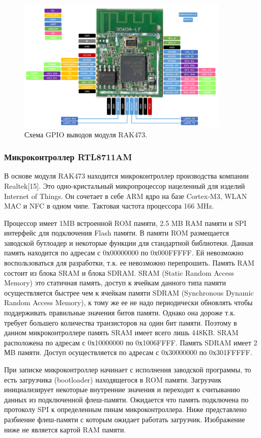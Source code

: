 \begin{figure}[h!]
    \centering
    \includegraphics[width=0.9\textwidth]{rak473_pinout.png}
    \caption{Схема GPIO выводов модуля RAK473.}
\end{figure}

\subsubsection{ Микроконтроллер RTL8711AM}
В основе модуля RAK473 находится микроконтроллер производства компании Realtek[15]. Это одно-кристальный микропроцессор нацеленный для изделий Internet of Things. Он сочетает в себе ARM ядро на базе Cortex-M3, WLAN MAC и NFC в одном чипе. Тактовая частота процессора 166 MHz. 

Процессор имеет 1MB встроенной ROM памяти, 2.5 MB RAM памяти и SPI интерфейс для подключения Flash памяти.  В памяти ROM размещается заводской бутлоадер и некоторые функции для стандартной библиотеки. Данная память находится по адресам с 0х00000000 по 0х000FFFFF. Ей невозможно воспользоваться для разработки, т.к. ее невозможно перепрошить. Память RAM состоит из блока SRAM и блока SDRAM. SRAM (Static Random Access Memory) это статичная память, доступ к ячейкам данного типа памяти осуществляется быстрее чем к ячейкам памяти SDRAM (Synchronous Dynamic Random Access Memory), к тому же ее не надо периодически обновлять чтобы поддерживать правильные значения битов памяти. Однако она дороже т.к. требует большего количества транзисторов на один бит памяти. Поэтому в данном микроконтроллере память SRAM имеет всего лишь 448KB. SRAM расположена по адресам с 0х10000000 по 0х1006FFFF. Память SDRAM имеет 2 МB памяти. Доступ осуществляется по адресам с 0х30000000 по 0х301FFFFF.

При записке микроконтроллер начинает с исполнения заводской программы, то есть загрузчика (bootloader) находящегося в ROM памяти. Загрузчик инициализирует некоторые внутренние значения и переходит к считыванию данных из подключенной флеш-памяти. Ожидается что память подключена по протоколу SPI к определенным пинам микроконтроллера. 
Ниже представлено разбиение флеш-памяти с которым ожидает работать загрузчик. Изображение ниже не является картой RAM памяти. 

